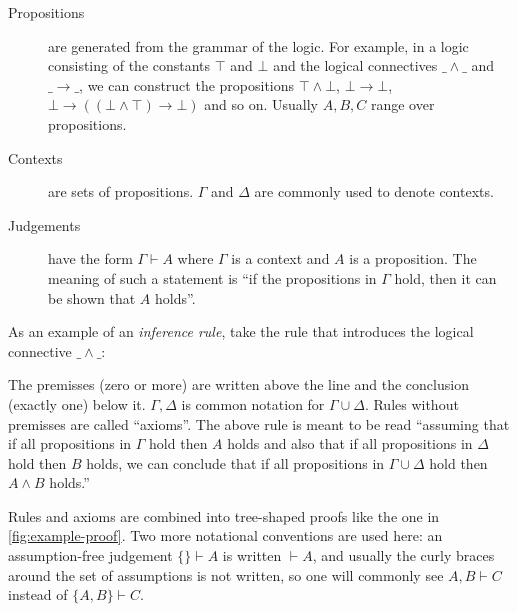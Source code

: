 \begin{description}
\item[Propositions] are generated from the grammar of the logic. For example, in a logic consisting of the constants \(\top\) and \(\bot\) and the logical connectives \(\_\!\!\wedge\!\!\_\) and \(\_\!\!\rightarrow\!\!\_\), we can construct the propositions \(\top \wedge \bot\), \(\bot \rightarrow \bot\), \(\bot \rightarrow ((\bot \wedge \top) \rightarrow \bot)\) and so on. Usually \(A, B, C\) range over propositions.
\item[Contexts] are sets of propositions. \(\Gamma\) and \(\Delta\) are commonly used to denote contexts.
\item[Judgements] have the form \(\Gamma \vdash A\) where \(\Gamma\) is a context and \(A\) is a proposition. The meaning of such a statement is \enquote{if the propositions in \(\Gamma\) hold, then it can be shown that \(A\) holds}.
\end{description}

As an example of an \emph{inference rule}, take the rule that introduces the logical connective \(\_\!\!\wedge\!\!\_\):

\begin{figure}[h]
\begin{prooftree}
\end{prooftree}
\end{figure}

The premisses (zero or more) are written above the line and the conclusion (exactly one) below it. \(\Gamma,\Delta\) is common notation for \(\Gamma \cup \Delta\). Rules without premisses are called \enquote{axioms}. The above rule is meant to be read \enquote{assuming that if all propositions in \(\Gamma\) hold then \(A\) holds and also that if all propositions in \(\Delta\) hold then \(B\) holds, we can conclude that if all propositions in \(\Gamma \cup \Delta\) hold then \(A \wedge B\) holds.}

Rules and axioms are combined into tree-shaped proofs like the one in \cref{fig:example-proof}. Two more notational conventions are used here: an assumption-free judgement \(\{\} \vdash A\) is written \(\vdash A\), and usually the curly braces around the set of assumptions is not written, so one will commonly see \(A,B \vdash C\) instead of \(\{A,B\} \vdash C\).

